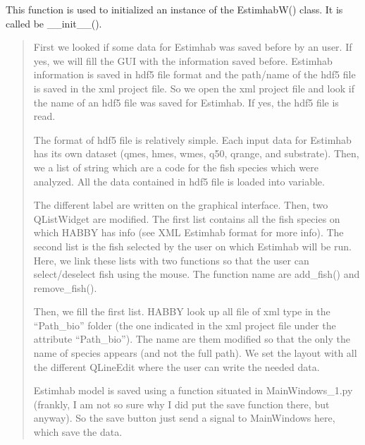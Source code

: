 \documentclass[letterpaper,10pt,english]{sphinxmanual}
\begin{document}
\begin{fulllineitems}
\begin{fulllineitems}
\label{\detokenize{index:src_GUI.estimhab_GUI.EstimhabW.init_iu}}
This function is used to initialized an instance of the EstimhabW() class. It is called be \_\_init\_\_().
\begin{quote}


First we looked if some data for Estimhab was saved before by an user. If yes, we will fill the GUI with
the information saved before. Estimhab information is saved in hdf5 file format and the path/name of the
hdf5 file is saved in the xml project file. So we open the xml project file and look if the name of an hdf5
file was saved for Estimhab. If yes, the hdf5 file is read.

The format of hdf5 file is relatively simple. Each input data for Estimhab has its own dataset (qmes, hmes,
wmes, q50, qrange, and substrate).  Then, we a list of string which are a code for the fish species which
were analyzed.  All the data contained in hdf5 file is loaded into variable.

The different label are written on the graphical interface. Then, two QListWidget are modified. The first
list contains all the fish species on which HABBY has info (see XML Estimhab format for more info).
The second list is the fish selected by the user on which Estimhab will be run. Here, we link these lists
with two functions so that the user can select/deselect fish using the mouse. The function name are add\_fish()
and remove\_fish().

Then, we fill the first list. HABBY look up all file of xml type in the “Path\_bio” folder (the one indicated in
the xml project file under the attribute “Path\_bio”).  The name are them modified so that the only the name of
species appears (and not the full path). We set the layout with all the different QLineEdit where the user
can write the needed data.

Estimhab model is saved using a function situated in MainWindows\_1.py  (frankly, I am not so sure why I did put
the save function there, but anyway). So the save button just send a signal to MainWindows
here, which save the data.
\end{quote}

\end{fulllineitems}



\end{fulllineitems}
\end{document}
